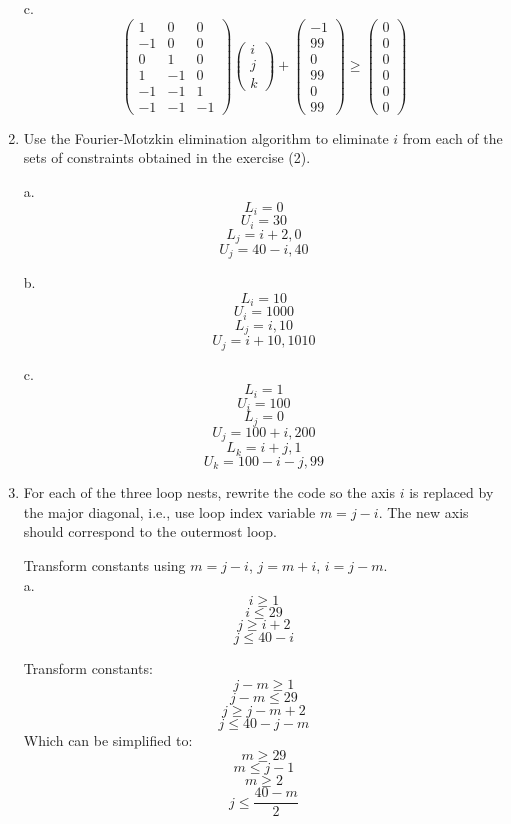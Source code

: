 \documentclass[11pt]{article}
\begin{document}
\begin{enumerate}
\begin{Answer}
		c.
		$$
		\begin{pmatrix}
		1 & 0 & 0  \\
		-1 & 0 & 0  \\
		0 & 1 & 0 \\
		1 & -1 & 0 \\
		-1 & -1 & 1 \\
		-1 & -1 & -1 
		\end{pmatrix}
		\begin{pmatrix}
		i \\
		j \\
		k
		\end{pmatrix}
		+
		\begin{pmatrix}
		-1 \\
		99 \\
		0 \\
		99 \\
		0 \\
		99
		\end{pmatrix}
		\ge
		\begin{pmatrix}
		0 \\
		0 \\
		0 \\
		0 \\
		0 \\
		0 
		\end{pmatrix}
		$$
		\end{Answer}
	\item Use the Fourier-Motzkin elimination algorithm to eliminate $i$ from each of the sets of constraints obtained in the exercise (2).
		\begin{Answer}
		a. 
		$$L_i = 0$$
		$$U_i = 30$$
		$$L_j = i + 2, 0$$
		$$U_j = 40 - i, 40$$
		
		b.
		$$L_i = 10$$
		$$U_i = 1000$$
		$$L_j = i, 10$$
		$$U_j = i + 10, 1010$$
		
		c.
		$$L_i = 1$$
		$$U_i = 100$$
		$$L_j = 0$$
		$$U_j = 100 + i, 200$$
		$$L_k = i + j, 1$$
		$$U_k = 100 - i -j, 99$$
		\end{Answer}
	\item For each of the three loop nests, rewrite the code so the axis $i$ is replaced by the major diagonal, i.e., use loop index variable $m=j-i$. The new axis should correspond to the outermost loop.
		\begin{Answer}
		Transform constants using $m=j -i$, $j = m + i$, $i = j - m$. \\
		a. 
		$$i \ge 1$$
		$$i \le 29$$
		$$j \ge i + 2$$
		$$j \le 40 - i$$
		
		Transform constants:
		$$j - m \ge 1$$
		$$j - m \le 29$$
		$$j \ge j - m + 2$$
		$$j \le 40 - j - m$$
		Which can be simplified to:
		$$m \ge 29$$
		$$m \le j - 1$$
		$$m \ge 2$$
		$$j \le \frac{40 - m}{2}$$
		

\end{Answer}
\end{enumerate}
\end{document}
